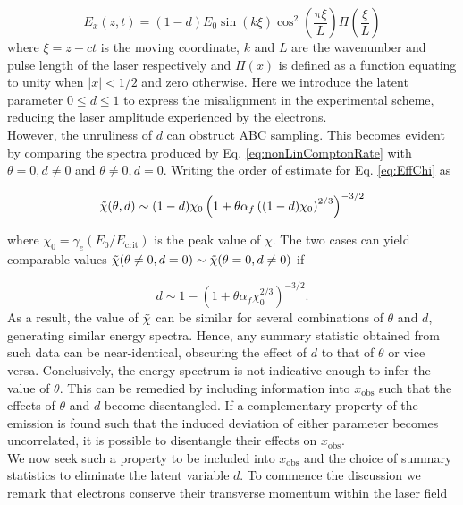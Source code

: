 \documentclass[%
 reprint,
 amsmath,amssymb,
 aps,
]{revtex4-2}
\begin{document}
\begin{equation} \label{eq:PWPulse}
    E_x(z, t) = (1-d) E_0 \sin \left(k \xi \right) \cos^2 \left(\frac{\pi \xi}{L} \right)\Pi\left( 
 \frac{\xi}{L} \right)
\end{equation}
where $\xi = z - ct$ is the moving coordinate, $k$ and $L$ are the wavenumber and pulse length of the laser respectively and $\Pi(x)$ is defined as a function equating to unity when $|x| < 1/2$ and zero otherwise. Here we introduce the latent parameter $0 \leq d \leq 1$ to express the misalignment in the experimental scheme, reducing the laser amplitude experienced by the electrons. \\

However, the unruliness of $d$ can obstruct ABC sampling. This becomes evident by comparing the spectra produced by Eq. \eqref{eq:nonLinComptonRate} with $\theta = 0, d \neq 0$ and $\theta \neq 0, d = 0$. Writing the order of estimate for Eq. \eqref{eq:EffChi} as

\begin{equation}
    \Tilde{\chi}(\theta, d) \sim (1-d) \chi_0 \left(1+\theta \alpha_f \left((1-d) \chi_0\right)^{2/3}  \right)^{-3/2}
\end{equation}

where $\chi_0 = \gamma_e \left(E_0/E_{\text{crit}}\right)$ is the peak value of $\chi$. The two cases can yield comparable values $\Tilde{\chi}(\theta\neq0, d=0) \sim \Tilde{\chi}(\theta=0, d\neq0)$ if

\begin{equation}
    d \sim 1 - \left(1+\theta \alpha_f \chi_0^{2/3}  \right)^{-3/2}.
\end{equation}
As a result, the value of $\Tilde{\chi}$ can be similar for several combinations of $\theta$ and $d$, generating similar energy spectra. Hence, any summary statistic obtained from such data can be near-identical, obscuring the effect of $d$ to that of $\theta$ or vice versa. Conclusively, the energy spectrum is not indicative enough to infer the value of $\theta$. This can be remedied by including information into $x_{\text{obs}}$ such that the effects of $\theta$ and $d$ become disentangled. If a complementary property of the emission is found such that the induced deviation of either parameter becomes uncorrelated, it is possible to disentangle their effects on $x_{\text{obs}}$. \\

We now seek such a property to be included into $x_{\text{obs}}$ and the choice of summary statistics to eliminate the latent variable $d$. To commence the discussion we remark that electrons conserve their transverse momentum within the laser field \cite{macchi2013superintense}
\end{document}
